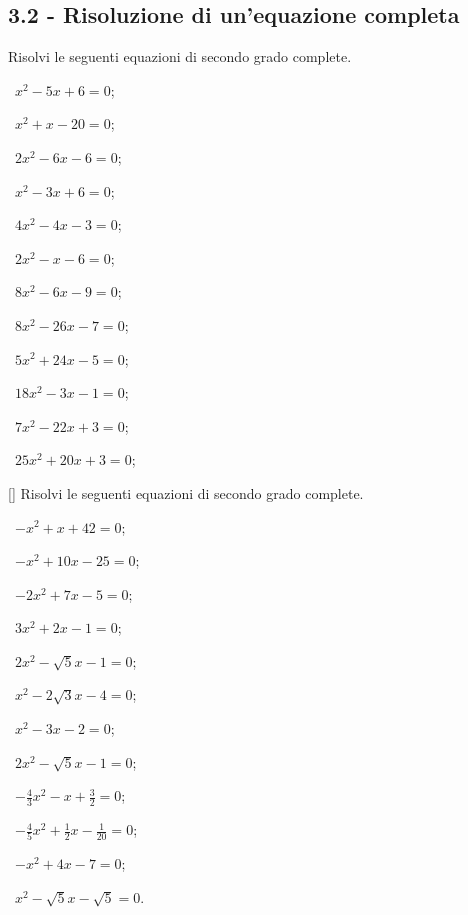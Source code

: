\subsection*{3.2 - Risoluzione di un'equazione completa}
\begin{esercizio}[\Ast]
 \label{ese:3.9}
Risolvi le seguenti equazioni di secondo grado complete.
\begin{multicols}{3}
 \begin{enumeratea}
 \item~$x^{2}-5 x + 6=0$;
 \item~$x^{2} + x-20=0$;
 \item~$2 x^{2}-6 x-6=0$;
 \item~$x^{2}-3 x + 6=0$;
 \item~$4x^{2}-4x-3=0$;
 \item~$2x^{2}-x-6=0$;
 \item~$8x^{2}-6x-9=0$;
 \item~$8x^{2}-26x-7=0$;
 \item~$5x^{2}+24x-5=0$;
 \item~$18x^{2}-3x-1=0$;
 \item~$7x^{2}-22x+3=0$;
 \item~$25x^{2}+20x+3=0$;
 \end{enumeratea}
 \end{multicols}
\end{esercizio}

\begin{esercizio}
 \label{ese:3.10}[\Ast]
Risolvi le seguenti equazioni di secondo grado complete.
\begin{multicols}{3}
 \begin{enumeratea}
 \item~$- x^{2} + x + 42=0$;
 \item~$- x^{2} + 10 x-25=0$;
 \item~$- 2 x^{2} + 7 x-5=0$;
 \item~$3 x^{2} + 2 x-1=0$;
 \item~$2 x^{2}-\sqrt{5} x-1 = 0$;
 \item~$x^{2}-2 \sqrt{3} x-4=0$;
 \item~$x^{2}-3 x-2=0$;
 \item~$2 x^{2}-\sqrt{5} x-1=0$;
 \item~$- \frac{4}{3} x^{2}-x + \frac{3}{2}=0$;
 \item~$- \frac{4}{5} x^{2} + \frac{1}{2} x-\frac{1}{20}=0$;
 \item~$- x^{2} + 4 x-7=0$;
 \item~$x^{2}-\sqrt{5} x-\sqrt{5}=0$.
 \end{enumeratea}
 \end{multicols}
\end{esercizio}


